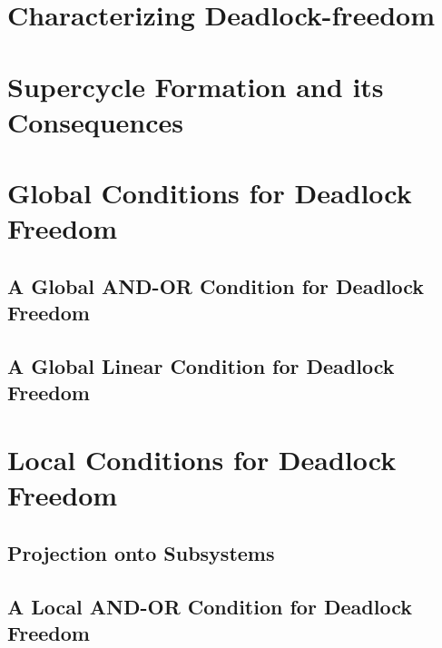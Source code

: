 \documentclass[11pt]{article}
\begin{document}
\section{Characterizing Deadlock-freedom}
\label{s:characterize}



\section{Supercycle Formation and its Consequences}
\label{secn:scFormation}



\section{Global Conditions for Deadlock Freedom}
\label{s:global}

   \subsection{A Global AND-OR Condition for Deadlock Freedom}
   \label{s:global.ANDOR}
   

   \subsection{A Global Linear Condition for Deadlock Freedom}
   \label{s:globCondition}
   \label{s:global.Linear}
   


\section{Local Conditions for Deadlock Freedom}
\label{s:local}

   \label{s:local.preamble}
   

   \subsection{Projection onto Subsystems}
   \label{s:projection}
   

   \subsection{A Local AND-OR Condition for Deadlock Freedom}
   \label{s:ANDORcond}
   
\end{document}
